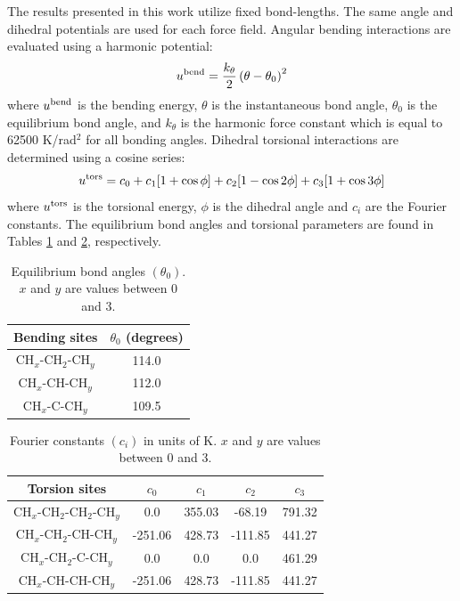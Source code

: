 \documentclass[preprint,review,12pt]{elsarticle}
\begin{document}
    The results presented in this work utilize fixed bond-lengths. The same angle and dihedral potentials are used for each force field. Angular bending interactions are evaluated using a harmonic potential:
	\begin{equation}
	u^{\rm bend} = \frac{k_\theta}{2} \left(\theta-\theta_0\right)^2
	\end{equation}
	where $u^{\rm bend}$ is the bending energy, $\theta$ is the instantaneous bond angle, $\theta_0$ is the equilibrium bond angle, and $k_\theta$ is the harmonic force constant which is equal to 62500 K/rad$^2$ for all bonding angles. Dihedral torsional interactions are determined using a cosine series:
	\begin{equation}
	u^{\rm tors} = c_0 + c_1 [1+\cos{\phi}] + c_2 [1-\cos{2\phi}] + c_3 [1+\cos{3\phi}]
	\end{equation}
	where $u^{\rm tors}$ is the torsional energy, $\phi$ is the dihedral angle and $c_i$ are the Fourier constants. The equilibrium bond angles and torsional parameters are found in Tables \ref{tab:angles} and \ref{tab:torsions}, respectively. 
	\begin{table}[h!]
		\caption{Equilibrium bond angles $(\theta_0)$. $x$ and $y$ are values between 0 and 3.} \label{tab:angles}
		\begin{center}
			\begin{tabular}{|c|c|}
				\hline
				Bending sites & $\theta_0$ (degrees) \\ \hline
				CH$_x$-CH$_2$-CH$_y$ & 114.0 \\ 
				CH$_x$-CH-CH$_y$ & 112.0 \\ 
				CH$_x$-C-CH$_y$ & 109.5 \\  
				\hline
			\end{tabular}
		\end{center} 
	\end{table}
	
	\begin{table}[h!]
		\caption{Fourier constants $(c_i)$ in units of K. $x$ and $y$ are values between 0 and 3.} \label{tab:torsions}
		\begin{center}
			\begin{tabular}{|c|c|c|c|c|}
				\hline
				Torsion sites & $c_0$ & $c_1$ & $c_2$ & $c_3$ \\ \hline
				CH$_x$-CH$_2$-CH$_2$-CH$_y$ & 0.0 & 355.03 & -68.19 & 791.32 \\ 
				CH$_x$-CH$_2$-CH-CH$_y$ & -251.06 & 428.73 & -111.85 & 441.27 \\
				CH$_x$-CH$_2$-C-CH$_y$ & 0.0 & 0.0 & 0.0 & 461.29 \\
				CH$_x$-CH-CH-CH$_y$ & -251.06 & 428.73 & -111.85 & 441.27 \\
				\hline
			\end{tabular}
		\end{center} 
	\end{table}
\end{document}
